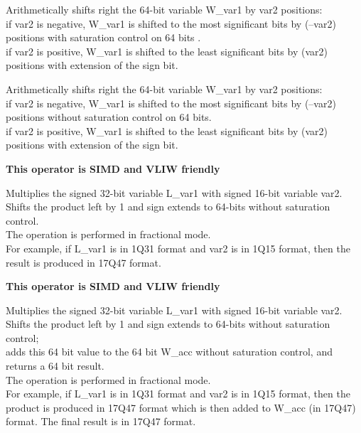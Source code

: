 
Arithmetically shifts right the 64-bit variable W\_var1 by var2 positions:\\
if var2 is negative, W\_var1 is shifted to the most significant bits by (–var2) positions with saturation control on 64 bits .\\
if var2 is positive, W\_var1 is shifted to the least significant bits by (var2) positions with extension of the sign bit.



Arithmetically shifts right the 64-bit variable W\_var1 by var2 positions:\\
if var2 is negative, W\_var1 is shifted to the most significant bits by (–var2) positions without saturation control on 64 bits.\\
if var2 is positive, W\_var1 is shifted to the least significant bits by (var2) positions with extension of the sign bit.



\textbf{ This operator is SIMD and VLIW friendly}

Multiplies the signed 32-bit variable L\_var1 with signed 16-bit variable var2.
Shifts the product left by 1 and sign extends to 64-bits without saturation control. \\
The operation is performed in fractional mode.\\
For example, if L\_var1 is in 1Q31 format and var2 is in 1Q15 format, then the result is produced in 17Q47 format.


\textbf{ This operator is SIMD and VLIW friendly}

Multiplies the signed 32-bit variable L\_var1 with signed 16-bit variable var2.
Shifts the product left by 1 and sign extends to 64-bits without saturation control;\\
adds this 64 bit value to the 64 bit W\_acc without saturation control, and returns a 64 bit result.\\
The operation is performed in fractional mode.\\
For example, if L\_var1 is in 1Q31 format and var2 is in 1Q15 format, then the product is produced in 17Q47 format which is then added to W\_acc (in 17Q47) format.
The final result is in 17Q47 format.

